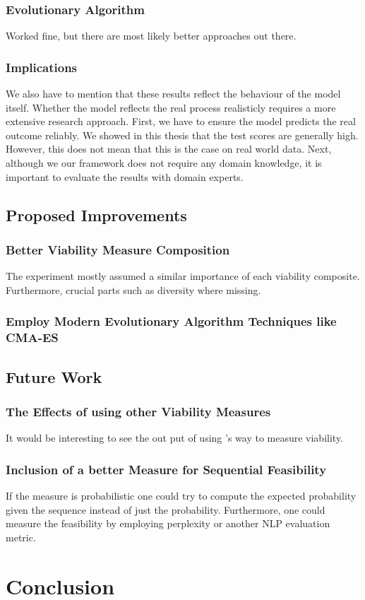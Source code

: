 \documentclass[12pt,a4paper]{report}
\begin{document}
\subsection{Evolutionary Algorithm}
Worked fine, but there are most likely better approaches out there.
\subsection{Implications}
We also have to mention that these results reflect the behaviour of the model itself. Whether the model reflects the real process realisticly requires a more extensive research approach. First, we have to ensure the model predicts the real outcome reliably. We showed in this thesis that the test scores are generally high. However, this does not mean that this is the case on real world data. Next, although we our framework does not require any domain knowledge, it is important to evaluate the results with domain experts. 

\section{Proposed Improvements}
\subsection{Better Viability Measure Composition}
The experiment mostly assumed a similar importance of each viability composite. Furthermore, crucial parts such as diversity where missing.
\subsection{Employ Modern Evolutionary Algorithm Techniques like CMA-ES}

\section{Future Work}
\subsection{The Effects of using other Viability Measures}
It would be interesting to see the out put of using \citeauthor{hsieh_DiCE4ELInterpretingProcess_2021}'s way to measure viability.
\subsection{Inclusion of a better Measure for Sequential Feasibility}
If the measure is probabilistic one could try to compute the expected probability given the sequence instead of just the probability.
Furthermore, one could measure the feasibility by employing perplexity or another NLP evaluation metric. 



\chapter{Conclusion}
\label{sec:conclusion}


\printbibliography

\appendix
\end{document}
